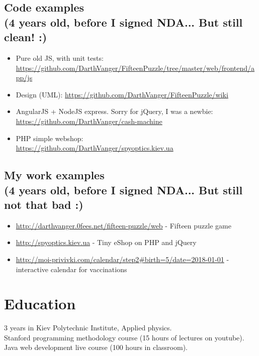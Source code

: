 \documentclass[a4paper, 14pt]{article}
\begin{document}
  \subsection{Code examples \\(4 years old, before I signed NDA... But still clean! :)}
  \begin{itemize}
    \item Pure old JS, with unit tests: \url{https://github.com/DarthVanger/FifteenPuzzle/tree/master/web/frontend/app/js}
    \\
  \item Design (UML): \url{https://github.com/DarthVanger/FifteenPuzzle/wiki}
    \\
    \item AngularJS + NodeJS express. Sorry for jQuery, I was a newbie:\\
      \url{https://github.com/DarthVanger/cash-machine} \\
    \item PHP simple webshop:\\
      \url{https://github.com/DarthVanger/spyoptics.kiev.ua} \\
\end{itemize}

  \subsection{My work examples \\(4 years old, before I signed NDA... But still not that bad :)}
  \begin{itemize}
    \item \url{http://darthvanger.0fees.net/fifteen-puzzle/web} - Fifteen puzzle game
    \\
    \item \url{http://spyoptics.kiev.ua} - Tiny eShop on PHP and jQuery
    \\
    \item \url{http://moi-privivki.com/calendar/step2#birth=5/date=2018-01-01} - interactive calendar for vaccinations
  \end{itemize}

\section{Education}
	3 years in Kiev Polytechnic Institute, Applied physics. \\
	Stanford programming methodology course (15 hours of lectures on youtube). \\
	Java web development live course (100 hours in classroom). \\
\end{document}
